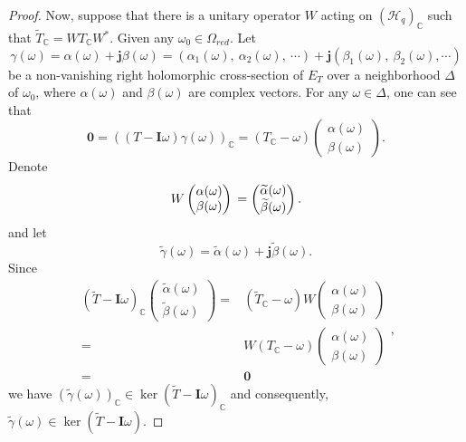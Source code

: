 \documentclass[pdflatex,sn-mathphys-num]{sn-jnl}%
\theoremstyle{thmstyleone}%
\theoremstyle{thmstyletwo}%
\theoremstyle{thmstylethree}%
\theoremstyle{definition}
\theoremstyle{remark}
\begin{document}
\begin{proof}
    Now, suppose that there is a unitary operator $W$ acting on $({\mathcal{H}_q})_\mathbb{C}$ such that $\widetilde{T}_{\mathbb{C}}=WT_{\mathbb{C}}W^*$. Given any $\omega_0\in\Omega_{red}$. Let
    $$
    \gamma(\omega)=\alpha(\omega)+\boldsymbol{j}\beta(\omega)=
    (\alpha_{1}(\omega),\ \alpha_{2}(\omega),\ \cdots)+\boldsymbol{j}(\beta_{1}(\omega),\ \beta_{2}(\omega),\cdots)
    $$
    be a non-vanishing right holomorphic cross-section of $E_T$ over a neighborhood $\Delta$ of $\omega_0$, where $\alpha(\omega)$ and $\beta(\omega)$ are complex vectors. For any $\omega\in\Delta$, one can see that
    $$
    \boldsymbol{0}=((T-\boldsymbol{I}\omega)\gamma(\omega))_{\mathbb{C}}=(T_{\mathbb{C}}-\omega)
    \begin{pmatrix}
    	\alpha(\omega) \\
    	\beta(\omega)
    	\end{pmatrix}.
    $$
    Denote
    $$
    W
    \begin{pmatrix}
    	\alpha(\omega) \\
    	\beta(\omega)
    \end{pmatrix} \\
    =\begin{pmatrix}
    	\widetilde{\alpha}(\omega) \\
    	\widetilde{\beta}(\omega)
    \end{pmatrix}.
$$
and let
    $$
    \widetilde{\gamma}(\omega)=\widetilde{\alpha}(\omega)+\boldsymbol{j}\widetilde{\beta}(\omega).
    $$
   Since
    $$\begin{aligned}
    (\widetilde{T}-\boldsymbol{I}\omega)_{\mathbb{C}}
    \begin{pmatrix}
    \widetilde{\alpha}(\omega) \\
    \widetilde{\beta}(\omega)
    \end{pmatrix}
    = & (\widetilde{T}_{{\mathbb{C}}}-\omega)W
    \begin{pmatrix}
    \alpha(\omega) \\
    \beta(\omega)
    \end{pmatrix}\\
    = & W(T_{{\mathbb{C}}}-\omega)
    \begin{pmatrix}
    \alpha(\omega) \\
    \beta(\omega)
    \end{pmatrix}\\
    =&\boldsymbol{0}
    \end{aligned},$$
    we have
    $(\widetilde{\gamma}(\omega))_{\mathbb{C}}\in\ker{(\widetilde{T}-\boldsymbol{I}\omega)_{\mathbb{C}}}$ and consequently, $\widetilde{\gamma}(\omega)\in\ker{(\widetilde{T}-\boldsymbol{I}\omega)}$.

\end{proof}
\end{document}

